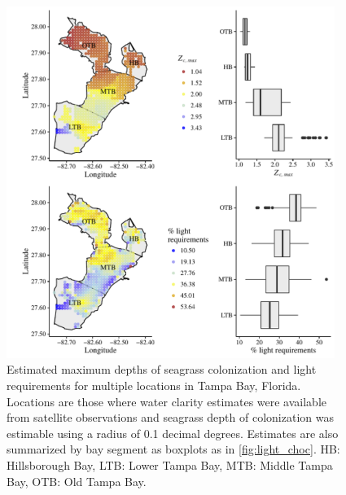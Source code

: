 \documentclass[letterpaper,12pt,oneside]{article}\usepackage[]{graphicx}\usepackage[]{color}
\begin{document}
\begin{figure}
\centering
\includegraphics[width = 0.95\textwidth]{figs/light_tb.pdf}
\caption{Estimated maximum depths of seagrass colonization and light requirements for multiple locations in Tampa Bay, Florida. Locations are those where water clarity estimates were available from satellite observations and seagrass depth of colonization was estimable using a radius of 0.1 decimal degrees.  Estimates are also summarized by bay segment as boxplots as in \cref{fig:light_choc}. HB: Hillsborough Bay, LTB: Lower Tampa Bay, MTB: Middle Tampa Bay, OTB: Old Tampa Bay.}
\label{fig:light_tb}
\end{figure}

\end{document}
